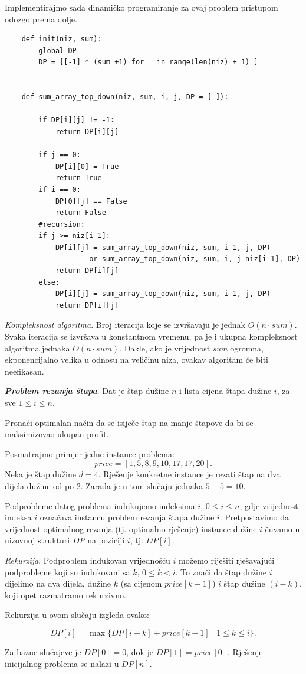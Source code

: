 Implementirajmo sada dinamičko programiranje za ovaj problem pristupom odozgo prema dolje.

   \begin{verbatim}
	def init(niz, sum):
		global DP
		DP = [[-1] * (sum +1) for _ in range(len(niz) + 1) ]
	
	
	def sum_array_top_down(niz, sum, i, j, DP = [ ]):
	
		if DP[i][j] != -1:
			return DP[i][j]
	
		if j == 0:
			DP[i][0] = True
			return True 
		if i == 0: 
			DP[0][j] == False
			return False
		#recursion: 
		if j >= niz[i-1]:
			DP[i][j] = sum_array_top_down(niz, sum, i-1, j, DP) 
	                or sum_array_top_down(niz, sum, i, j-niz[i-1], DP)
			return DP[i][j]
		else:
			DP[i][j] = sum_array_top_down(niz, sum, i-1, j, DP)
			return DP[i][j]
\end{verbatim}  

\textit{Kompleksnost algoritma}. Broj iteracija koje se izvršavaju je jednak $O(n \cdot sum)$. Svaka iteracija se izvršava u konstantnom vremenu, pa je i ukupna kompleksnost algoritma jednaka  $O(n \cdot sum)$. Dakle, ako je vrijednost \emph{sum} ogromna, ekponencijalno velika u odnosu na veličinu niza, ovakav algoritam će biti neefikasan. 



\begin{example}
	\textbf{\textit{Problem rezanja štapa}}. Dat je štap dužine $n$ i lista cijena štapa dužine $i$, za sve $1 \leq i \leq n$.
	
	Pronaći optimalan način da se isiječe  štap na manje
	štapove da bi se maksimizovao ukupan profit.
\end{example}


\begin{solution}
	Posmatrajmo primjer jedne instance problema: 
	$$ price = [1, 5, 8, 9, 10,
	17, 17, 20].$$  Neka je štap dužine $d=4$.
	Rješenje konkretne instance je rezati štap na dva dijela dužine od po 2. Zarada je u tom slučaju jednaka $5 + 5 = 10$.  \\ \vspace{0.2cm}
	
	 Podprobleme datog problema indukujemo indeksima $i$, $0 \leq i \leq n$, gdje vrijednost indeksa $i$ označava instancu problem rezanja štapa dužine $i$. Pretpostavimo da vrijednost optimalnog rezanja (tj. optimalno rješenje)  instance dužine $i$ čuvamo u nizovnoj strukturi $DP$ na poziciji $i$, tj. $DP[i]$.
	 
	 \textit{Rekurzija}. Podproblem indukovan vrijednošću $i$ možemo  riješiti rješavajući podprobleme koji su indukovani sa $k$, $0 \leq k < i$. To znači da štap dužine $i$ dijelimo na dva dijela, dužine $k$ (sa cijenom $price[k-1]$) $i$ štap dužine $(i-k)$, koji opet razmatramo rekurzivno.  
	 
	 Rekurzija u ovom slučaju izgleda ovako:
	 
	 $$ DP[i] = \max \{ DP[i-k] + price[k-1] \mid 1 \leq k \leq i\}.$$
	 
	 Za bazne slučajeve je $DP[0] = 0$, dok je $DP[1] = price[0]$.
	 Rješenje inicijalnog problema se nalazi u $DP[n]$.
\end{solution}

